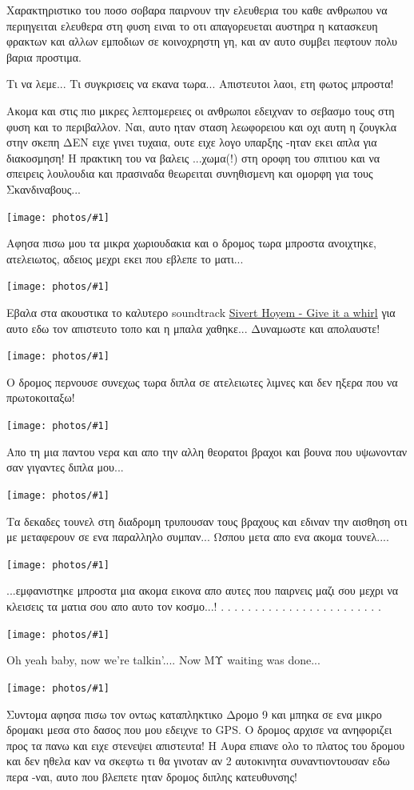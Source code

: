 \documentclass[11pt, letterpaper]{book}
\newcommand\photo[1]{\begin{center}\noindent\texttt{[image: photos/\#1]}\end{center}}
\begin{document}
Χαρακτηριστικο του ποσο σοβαρα παιρνουν την ελευθερια του καθε ανθρωπου να περιηγειται ελευθερα στη φυση ειναι το οτι απαγορευεται αυστηρα η κατασκευη φρακτων και αλλων εμποδιων σε κοινοχρηστη γη, και αν αυτο συμβει πεφτουν πολυ βαρια προστιμα.

Τι να λεμε... Τι συγκρισεις να εκανα τωρα... Απιστευτοι λαοι, ετη φωτος μπροστα!

Ακομα και στις πιο μικρες λεπτομερειες οι ανθρωποι εδειχναν το σεβασμο τους στη φυση και το περιβαλλον.
Ναι, αυτο ηταν σταση λεωφορειου και οχι αυτη η ζουγκλα στην σκεπη ΔΕΝ ειχε γινει τυχαια, ουτε ειχε λογο υπαρξης -ηταν εκει απλα για διακοσμηση! Η πρακτικη του να βαλεις ...χωμα(!) στη οροφη του σπιτιου και να σπειρεις λουλουδια και πρασιναδα θεωρειται συνηθισμενη και ομορφη για τους Σκανδιναβους... 

\photo{162.jpg}

Αφησα πισω μου τα μικρα χωριουδακια και ο δρομος τωρα μπροστα ανοιχτηκε, ατελειωτος, αδειος μεχρι εκει που εβλεπε το ματι...

\photo{163.jpg}

Εβαλα στα ακουστικα το καλυτερο soundtrack \href{http://goo.gl/xUsd7}{Sivert Hoyem - Give it a whirl} για αυτο εδω τον απιστευτο τοπο και η μπαλα χαθηκε... 
Δυναμωστε και απολαυστε!

\photo{164.jpg}

Ο δρομος περνουσε συνεχως τωρα διπλα σε ατελειωτες λιμνες και δεν ηξερα που να πρωτοκοιταξω! 

\photo{165.jpg}

Απο τη μια παντου νερα και απο την αλλη θεορατοι βραχοι και βουνα που υψωνονταν σαν γιγαντες διπλα μου...

\photo{166.jpg}

Τα δεκαδες τουνελ στη διαδρομη τρυπουσαν τους βραχους και εδιναν την αισθηση οτι με μεταφερουν σε ενα παραλληλο συμπαν...
Ωσπου μετα απο ενα ακομα τουνελ....

\photo{167.jpg}

...εμφανιστηκε μπροστα μια ακομα εικονα απο αυτες που παιρνεις μαζι σου μεχρι να κλεισεις τα ματια σου απο αυτο τον κοσμο...!
.
.
.
.
.
.
.
.
.
.
.
.
.
.
.
.
.
.
.
.
.
.
.
.

\photo{168.jpg}

Οh yeah baby, now we're talkin'....
Now ΜΥ waiting was done...

\photo{169.jpg}

Συντομα αφησα πισω τον οντως καταπληκτικο Δρομο 9 και μπηκα σε ενα μικρο δρομακι μεσα στο δασος που μου εδειχνε το GPS. 
Ο δρομος αρχισε να ανηφοριζει προς τα πανω και ειχε στενεψει απιστευτα! Η Αυρα επιανε ολο το πλατος του δρομου και δεν ηθελα καν να σκεφτω τι θα γινοταν αν 2 αυτοκινητα συναντιοντουσαν εδω περα -ναι, αυτο που βλεπετε ηταν δρομος διπλης κατευθυνσης!
\end{document}
